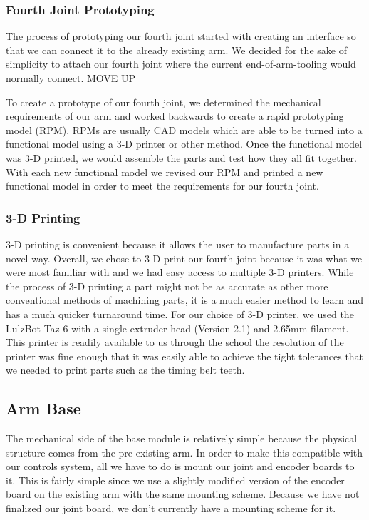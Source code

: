\subsubsection{Fourth Joint Prototyping}
The process of prototyping our fourth joint started with creating an interface so that we can connect it to the already existing arm.  We decided for the sake of simplicity to attach our fourth joint where the current end-of-arm-tooling would normally connect. MOVE UP

To create a prototype of our fourth joint, we determined the mechanical requirements of our arm and worked backwards to create a rapid prototyping model (RPM).  RPMs are usually CAD models which are able to be turned into a functional model using a 3-D printer or other method.  Once the functional model was 3-D printed, we would assemble the parts and test how they all fit together.  With each new functional model we revised our RPM and printed a new functional model in order to meet the requirements for our fourth joint.  

\subsubsection{3-D Printing}
3-D printing is convenient because it allows the user to manufacture parts in a novel way. Overall, we chose to 3-D print our fourth joint because it was what we were most familiar with and we had easy access to multiple 3-D printers.  While the process of 3-D printing a part might not be as accurate as other more conventional methods of machining parts, it is a much easier method to learn and has a much quicker turnaround time. For our choice of 3-D printer, we used the LulzBot Taz 6 with a single extruder head (Version 2.1) and 2.65mm filament. This printer is readily available to us through the school the resolution of the printer was fine enough that it was easily able to achieve the tight tolerances that we needed to print parts such as the timing belt teeth.    

\subsection{Arm Base}
The mechanical side of the base module is relatively simple because the physical structure comes from the pre-existing arm. In order to make this compatible with our controls system, all we have to do is mount our joint and encoder boards to it.  This is fairly simple since we use a slightly modified version of the encoder board on the existing arm with the same mounting scheme. Because we have not finalized our joint board, we don't currently have a mounting scheme for it. 

